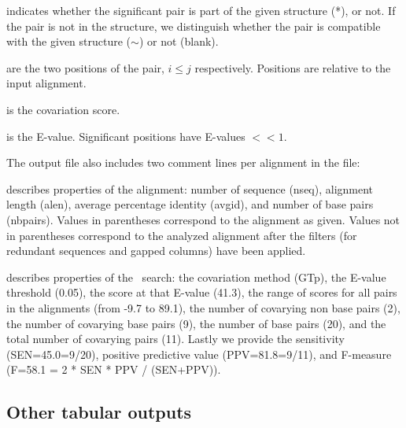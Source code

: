 \begin{sreitems}{}
 \item[\prog{First column}] indicates whether the significant pair is
   part of the given structure (*), or not.  If the pair is not in the
   structure, we distinguish whether the pair is compatible with the
   given structure ($\sim$) or not (blank).

 \item[\prog{Second and third columns}] are the two positions of the
   pair, $i\leq j$ respectively. Positions are relative to the input
   alignment.

 \item[\prog{Fourth column}] is the covariation score.

 \item[\prog{Fifth column}] is the E-value. Significant positions
   have E-values $<< 1$.
 \end{sreitems}
 The output file also includes two comment lines per alignment in the
 file:

 \begin{sreitems}{} \item[\prog{First
 comment line}]describes properties of the alignment: number of
 sequence (nseq), alignment length (alen), average percentage identity
 (avgid), and number of base pairs (nbpairs).  Values in parentheses
 correspond to the alignment as given. Values not in parentheses
 correspond to the analyzed alignment after the filters (for redundant
 sequences and gapped columns) have been applied.

 \item[\prog{Second comment line}]describes properties of the
   \rscape\ search: the covariation method (GTp), the E-value threshold
   (0.05), the score at that E-value (41.3), the range of scores for all
   pairs in the alignments (from -9.7 to 89.1), the number of covarying
   non base pairs (2), the number of covarying base pairs (9), the
   number of base pairs (20), and the total number of covarying pairs
   (11). Lastly we provide the sensitivity (SEN=45.0=9/20), positive
   predictive value (PPV=81.8=9/11), and F-measure (F=58.1 = 2 * SEN *
   PPV / (SEN+PPV)).
 \end{sreitems}


\subsection{Other tabular outputs}

